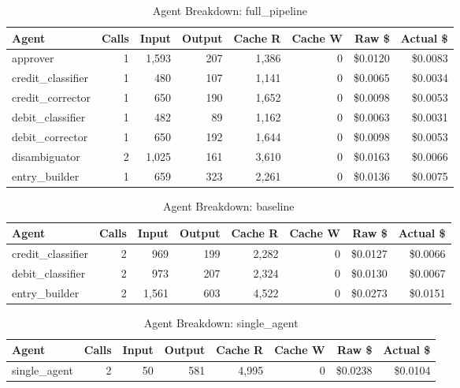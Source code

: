 \begin{table}[htbp]
\centering
\caption{Agent Breakdown: full\_pipeline}
\label{tab:agent-full-pipeline}
\begin{tabular}{l r rr rr rr}
\toprule
Agent & Calls & Input & Output & Cache R & Cache W & Raw \$ & Actual \$ \\
\midrule
  approver & 1 & 1,593 & 207 & 1,386 & 0 & \$0.0120 & \$0.0083 \\
  credit\_classifier & 1 & 480 & 107 & 1,141 & 0 & \$0.0065 & \$0.0034 \\
  credit\_corrector & 1 & 650 & 190 & 1,652 & 0 & \$0.0098 & \$0.0053 \\
  debit\_classifier & 1 & 482 & 89 & 1,162 & 0 & \$0.0063 & \$0.0031 \\
  debit\_corrector & 1 & 650 & 192 & 1,644 & 0 & \$0.0098 & \$0.0053 \\
  disambiguator & 2 & 1,025 & 161 & 3,610 & 0 & \$0.0163 & \$0.0066 \\
  entry\_builder & 1 & 659 & 323 & 2,261 & 0 & \$0.0136 & \$0.0075 \\
\bottomrule
\end{tabular}
\end{table}

\begin{table}[htbp]
\centering
\caption{Agent Breakdown: baseline}
\label{tab:agent-baseline}
\begin{tabular}{l r rr rr rr}
\toprule
Agent & Calls & Input & Output & Cache R & Cache W & Raw \$ & Actual \$ \\
\midrule
  credit\_classifier & 2 & 969 & 199 & 2,282 & 0 & \$0.0127 & \$0.0066 \\
  debit\_classifier & 2 & 973 & 207 & 2,324 & 0 & \$0.0130 & \$0.0067 \\
  entry\_builder & 2 & 1,561 & 603 & 4,522 & 0 & \$0.0273 & \$0.0151 \\
\bottomrule
\end{tabular}
\end{table}

\begin{table}[htbp]
\centering
\caption{Agent Breakdown: single\_agent}
\label{tab:agent-single-agent}
\begin{tabular}{l r rr rr rr}
\toprule
Agent & Calls & Input & Output & Cache R & Cache W & Raw \$ & Actual \$ \\
\midrule
  single\_agent & 2 & 50 & 581 & 4,995 & 0 & \$0.0238 & \$0.0104 \\
\bottomrule
\end{tabular}
\end{table}
